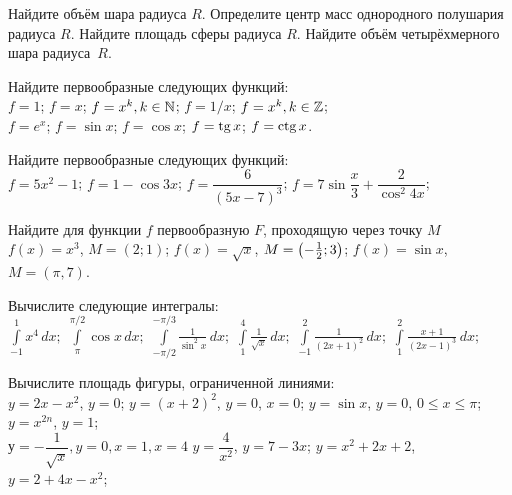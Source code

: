 \documentclass[a4paper,12pt]{article}
\begin{document}
 Найдите объём шара радиуса $R$.
 Определите центр масс однородного полушария радиуса $R$.
 Найдите площадь сферы радиуса $R$.
 Найдите объём четырёхмерного шара радиуса~$R$.


 Найдите первообразные следующих функций:\\
 $f=1$;
 $f=x$;
 $f=x^k, k\in \mathbb{N}$;
 $f=1/x$;
 $f=x^k, k\in \mathbb{Z}$;\\
 $f=e^x$;
 $f=\sin x $;
 $f=\cos x $;
 $f=\tg x $;
 $f=\ctg x $.

 Найдите первообразные следующих функций:\\
 $f=5x^2-1$;
 $f=1-\cos 3x$;
 $f=\dfrac{6}{(5x-7)^3}$;
 $f=7\sin\dfrac{x}{3}+\dfrac{2}{\cos^2{4x}}$;


Найдите для функции $f$ первообразную $F$, проходящую через точку $M$\\
 $f(x)=x^3$, $M=(2;1)$;
 $f(x)=\sqrt{x}$, $M=\left(-\frac12;3\right)$;
 $f(x)=\sin x$, $M = (\pi, 7)$.


Вычислите следующие интегралы:\\
$\displaystyle\int\limits_{ -1     }^{ 1       }  x^4         \,   dx;$
$\displaystyle\int\limits_{   \pi  }^{  \pi/2  }  \cos x      \,   dx;$
$\displaystyle\int\limits_{ -\pi/2 }^{ -\pi/3  }\frac{1}{\sin^2x}\,   dx;$
$\displaystyle\int\limits_{  1     }^{  4     }\frac1{\sqrt x}\,   dx;$
$\displaystyle\int\limits_{ -1      }^{2        } \frac{1}{(2x+1)^2}        \,   dx;$
$\displaystyle\int\limits_{  1     }^{ 2       }  \frac{x+1}{(2x-1)^3}            \,   dx;$


Вычислите площадь фигуры, ограниченной линиями:\\
$y=2x-x^2$, $y=0$;
$y=(x+2)^2$, $y=0$, $x=0$;
$y=\sin x$, $y=0$, $0\le x\le \pi$;
$y = x^{2n} $, $ y = 1$;\\
$у=-\dfrac{1}{\sqrt{x}}, y = 0, x=1, x=4$
$y = \dfrac{4}{x^2} $, $ y = 7-3x$;
$y = x^2+2x+2 $, $ y = 2+4x-x^2$;

\vfil
{}

\end{document}
